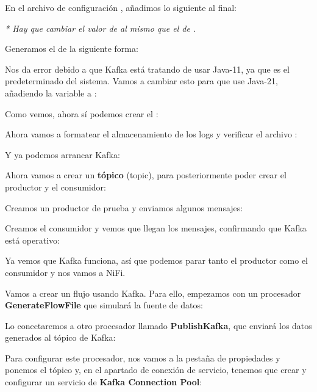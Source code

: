\documentclass{../../miPlantilla}
\begin{document}
En el archivo de configuración , añadimos lo siguiente al final:


\textit{* Hay que cambiar el valor de  al mismo que el de .}

Generamos el  de la siguiente forma:


Nos da error debido a que Kafka está tratando de usar Java-11, ya que es el predeterminado del sistema. Vamos a cambiar esto para que use Java-21, añadiendo la variable  a :


Como vemos, ahora sí podemos crear el :


Ahora vamos a formatear el almacenamiento de los logs y verificar el archivo :


Y ya podemos arrancar Kafka:


\newpage

Ahora vamos a crear un \textbf{tópico} (topic), para posteriormente poder crear el productor y el consumidor:


Creamos un productor de prueba y enviamos algunos mensajes:


Creamos el consumidor y vemos que llegan los mensajes, confirmando que Kafka está operativo:


Ya vemos que Kafka funciona, así que podemos parar tanto el productor como el consumidor y nos vamos a NiFi.

Vamos a crear un flujo usando Kafka. Para ello, empezamos con un procesador \textbf{GenerateFlowFile} que simulará la fuente de datos:


Lo conectaremos a otro procesador llamado \textbf{PublishKafka}, que enviará los datos generados al tópico de Kafka:


Para configurar este procesador, nos vamos a la pestaña de propiedades y ponemos el tópico y, en el apartado de conexión de servicio, tenemos que crear y configurar un servicio de \textbf{Kafka Connection Pool}:
\end{document}
